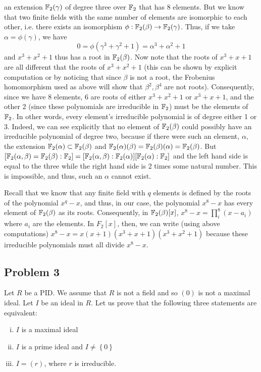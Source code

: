 \documentclass{../../mathnotes}
\begin{document}
\begin{enumerate}[(i)]
        an extension $\mathbb{F}_2(\gamma)$ of degree three over $\mathbb{F}_2$ that has 8 elements. But we know that two finite fields
        with the same number of elements are isomorphic to each other, i.e. there exists an isomorphism
        $\phi:\mathbb{F}_2(\beta)\to\mathbb{F}_2(\gamma)$. Thus, if we take $\alpha=\phi(\gamma)$, we have
        \[0=\phi(\gamma^3+\gamma^2+1)=\alpha^3+\alpha^2+1\]
        and $x^3+x^2+1$ thus has a root in $\mathbb{F}_2(\beta)$. Now note that the roots of $x^3+x+1$ are all different that the roots of
        $x^3+x^2+1$ (this can be shown by explicit computation or by noticing that since $\beta$ is not a root, the Frobenius
        homomorphism used as above will show that $\beta^2,\beta^4$ are not roots). Consequently, since we have 8 elements,
        6 are roots of either $x^3+x^2+1$ or $x^3+x+1$, and the other 2 (since these polynomials are irreducible in $\mathbb{F}_2$)
        must be the elements of $\mathbb{F}_2$. In other words, every element's irreducible polynomial is of degree either 1 or 3.
        Indeed, we can see explicitly that no element of $\mathbb{F}_2(\beta)$ could possibly have an irreducible polynomial of degree
        two, because if there were such an element, $\alpha$, the extension $\mathbb{F}_2(\alpha)\subset\mathbb{F}_2(\beta)$ and
        $\mathbb{F}_2(\alpha)(\beta)=\mathbb{F}_2(\beta)(\alpha)=\mathbb{F}_2(\beta)$. But $[\mathbb{F}_2(\alpha,\beta)=\mathbb{F}_2(\beta):\mathbb{F}_2]=[\mathbb{F}_2(\alpha,\beta):\mathbb{F}_2(\alpha)][\mathbb{F}_2(\alpha):\mathbb{F}_2]$
        and the left hand side is equal to the three while the right hand side is 2 times some natural number. This is impossible,
        and thus, such an $\alpha$ cannot exist.

        Recall that we know that any finite field with $q$ elements is defined by the roots of the polynomial $x^q-x$, and thus,
        in our case, the polynomial $x^8-x$ has every element of $\mathbb{F}_2(\beta)$ as its roots. Consequently, in $\mathbb{F}_2(\beta)[x]$,
        $x^8-x=\prod_i^8 (x-a_i)$ where $a_i$ are the elements. In $F_2[x]$, then, we can write (using above computations)
        $x^8-x=x(x+1)(x^3+x+1)(x^3+x^2+1)$ because these irreducible polynomials must all divide $x^8-x$.
\end{enumerate}

\subsection*{Problem 3}

Let $R$ be a PID. We assume that $R$ is not a field and so $(0)$ is not a maximal ideal. Let $I$ be an ideal in $R$.
Let us prove that the following three statements are equivalent:
\begin{enumerate}[(i)]
    \item $I$ is a maximal ideal
    \item $I$ is a prime ideal and $I\neq\left\{ 0 \right\}$
    \item $I=(r)$, where $r$ is irreducible.
\end{enumerate}
\end{document}
